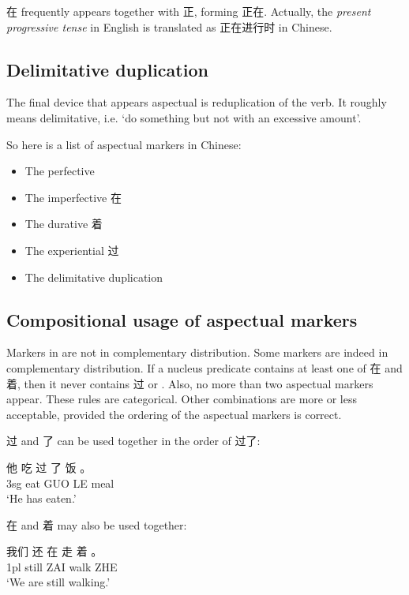 在 frequently appears together with 正, forming 正在. 
Actually, the \emph{present progressive tense} in English is translated as 正在进行时 in Chinese.

\subsection{Delimitative duplication}\label{sec:delimitative-duplication}

The final device that appears aspectual is reduplication of the verb. 
It roughly means delimitative, i.e. `do something but not with an excessive amount'.

So here is a list of aspectual markers in Chinese: 
\begin{itemize}
    \item The perfective 
    \item The imperfective 在
    \item The durative 着
    \item The experiential 过
    \item The delimitative duplication
\end{itemize}

\subsection{Compositional usage of aspectual markers}

Markers in  are not in complementary distribution.
Some markers are indeed in complementary distribution. 
If a nucleus predicate contains at least one of 在 and 着, 
then it never contains 过 or .
Also, no more than two aspectual markers appear.
These rules are categorical. Other combinations are more or less acceptable,
provided the ordering of the aspectual markers is correct.

过 and 了 can be used together in the order of 过了: 
\begin{exe}
    \ex \gll 他 吃 过 了 饭 。\\
    3sg eat GUO LE meal \\
    \glt `He has eaten.'
\end{exe}
在 and 着 may also be used together:
\begin{exe}
    \ex \gll 我们 还 在 走 着 。 \\
    1pl still ZAI walk ZHE \\
    \glt `We are still walking.'
\end{exe}

